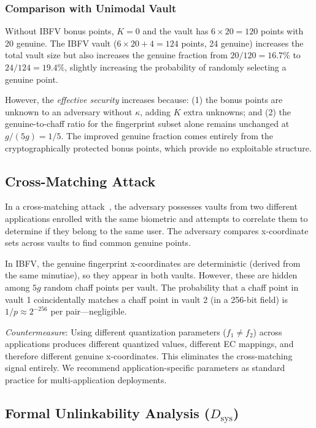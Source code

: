 \documentclass[conference]{IEEEtran}
\newcommand{\IBFV}{\textsf{IBFV}}
\begin{document}
\subsubsection{Comparison with Unimodal Vault}
Without \IBFV{} bonus points, $K = 0$ and the vault has $6 \times 20 = 120$ points with 20 genuine. The IBFV vault ($6 \times 20 + 4 = 124$ points, 24 genuine) increases the total vault size but also increases the genuine fraction from $20/120 = 16.7\%$ to $24/124 = 19.4\%$, slightly increasing the probability of randomly selecting a genuine point.

However, the \emph{effective security} increases because: (1) the bonus points are unknown to an adversary without $\kappa$, adding $K$ extra unknowns; and (2) the genuine-to-chaff ratio for the fingerprint subset alone remains unchanged at $g/(5g) = 1/5$. The improved genuine fraction comes entirely from the cryptographically protected bonus points, which provide no exploitable structure.

\subsection{Cross-Matching Attack}
\label{sec:cross_matching}

In a cross-matching attack~\cite{tams2013attacks}, the adversary possesses vaults from two different applications enrolled with the same biometric and attempts to correlate them to determine if they belong to the same user. The adversary compares x-coordinate sets across vaults to find common genuine points.

In \IBFV{}, the genuine fingerprint x-coordinates are deterministic (derived from the same minutiae), so they appear in both vaults. However, these are hidden among $5g$ random chaff points per vault. The probability that a chaff point in vault 1 coincidentally matches a chaff point in vault 2 (in a 256-bit field) is $1/p \approx 2^{-256}$ per pair---negligible.

\emph{Countermeasure}: Using different quantization parameters ($f_1 \neq f_2$) across applications produces different quantized values, different EC mappings, and therefore different genuine x-coordinates. This eliminates the cross-matching signal entirely. We recommend application-specific parameters as standard practice for multi-application deployments.

\subsection{Formal Unlinkability Analysis ($D_{\text{sys}}$)}
\label{sec:dsys}
\end{document}
